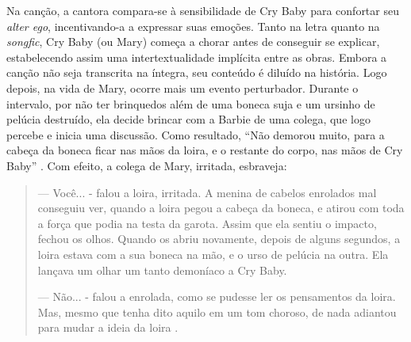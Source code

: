 Na canção, a cantora compara-se à sensibilidade de Cry Baby para
confortar seu \emph{alter ego}, incentivando-a a expressar suas emoções.
Tanto na letra quanto na \emph{songfic}, Cry Baby (ou Mary) começa a
chorar antes de conseguir se explicar, estabelecendo assim uma
intertextualidade implícita entre as obras. Embora a canção não seja
transcrita na íntegra, seu conteúdo é diluído na história. Logo depois,
na vida de Mary, ocorre mais um evento perturbador. Durante o intervalo,
por não ter brinquedos além de uma boneca suja e um ursinho de pelúcia
destruído, ela decide brincar com a Barbie de uma colega, que logo
percebe e inicia uma discussão. Como resultado, ``Não demorou muito,
para a cabeça da boneca ficar nas mãos da loira, e o restante do corpo,
nas mãos de Cry Baby'' \cite{brookeyoongi}. Com efeito, a colega
de Mary, irritada, esbraveja:

\begin{quote}
--- Você... - falou a loira, irritada. A menina de cabelos enrolados mal
conseguiu ver, quando a loira pegou a cabeça da boneca, e atirou com
toda a força que podia na testa da garota. Assim que ela sentiu o
impacto, fechou os olhos. Quando os abriu novamente, depois de alguns
segundos, a loira estava com a sua boneca na mão, e o urso de pelúcia na
outra. Ela lançava um olhar um tanto demoníaco a Cry Baby.

--- Não... - falou a enrolada, como se pudesse ler os pensamentos da
loira. Mas, mesmo que tenha dito aquilo em um tom choroso, de nada
adiantou para mudar a ideia da loira \cite{brookeyoongi}.
\end{quote}

